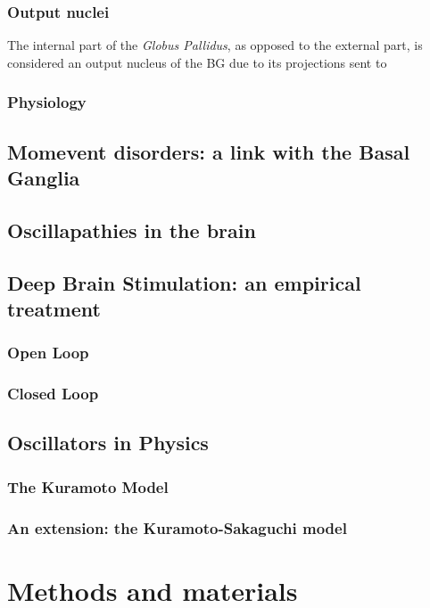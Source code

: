 \documentclass[MSc,english]{Container/thesistemplate}
\begin{document}
\subsection*{Output nuclei}
The internal part of the \emph{Globus Pallidus}, as opposed to the external part, is considered an output nucleus of the BG due to its projections sent to 


\subsection{Physiology}


\newpage
\section{Momevent disorders: a link with the Basal Ganglia}

\newpage
\section{Oscillapathies in the brain}

\newpage
\section{Deep Brain Stimulation: an empirical treatment}
\subsection{Open Loop}
\subsection{Closed Loop}

\newpage
\section{Oscillators in Physics}
\subsection{The Kuramoto Model}
\subsection{An extension: the Kuramoto-Sakaguchi model}

\newpage
\chapter{Methods and materials}




\end{document}
